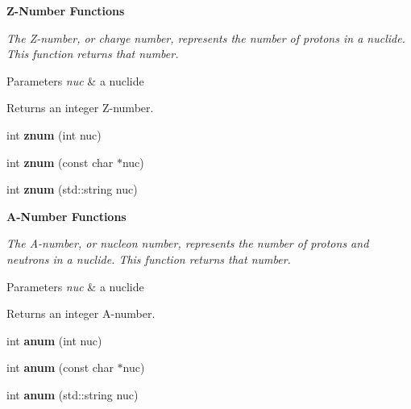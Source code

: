 \begin{Indent}\textbf{ Z-\/\+Number Functions}\par
{\em The Z-\/number, or charge number, represents the number of protons in a nuclide. This function returns that number. 
\begin{DoxyParams}{Parameters}
{\em nuc} & a nuclide \\
\hline
\end{DoxyParams}
\begin{DoxyReturn}{Returns}
an integer Z-\/number. 
\end{DoxyReturn}
}\begin{DoxyCompactItemize}
\item 
\mbox{\label{namespacepyne_1_1nucname_a2c04523f8462b5904458efa27433d159}} 
int {\bfseries znum} (int nuc)
\item 
\mbox{\label{namespacepyne_1_1nucname_a3447b849d0cb1cc8f6f51caaf2e441ee}} 
int {\bfseries znum} (const char $\ast$nuc)
\item 
\mbox{\label{namespacepyne_1_1nucname_a2af22abe099e287b32b869262eef1b21}} 
int {\bfseries znum} (std\+::string nuc)
\end{DoxyCompactItemize}
\end{Indent}
\begin{Indent}\textbf{ A-\/\+Number Functions}\par
{\em The A-\/number, or nucleon number, represents the number of protons and neutrons in a nuclide. This function returns that number. 
\begin{DoxyParams}{Parameters}
{\em nuc} & a nuclide \\
\hline
\end{DoxyParams}
\begin{DoxyReturn}{Returns}
an integer A-\/number. 
\end{DoxyReturn}
}\begin{DoxyCompactItemize}
\item 
\mbox{\label{namespacepyne_1_1nucname_a64059037d5c5928c3f736754b8f20f10}} 
int {\bfseries anum} (int nuc)
\item 
\mbox{\label{namespacepyne_1_1nucname_a175e7d94fc64b7b8ec745aa5d8d3502a}} 
int {\bfseries anum} (const char $\ast$nuc)
\item 
\mbox{\label{namespacepyne_1_1nucname_ac1fa1ad42620cc2f337f8b836508185e}} 
int {\bfseries anum} (std\+::string nuc)
\end{DoxyCompactItemize}
\end{Indent}

